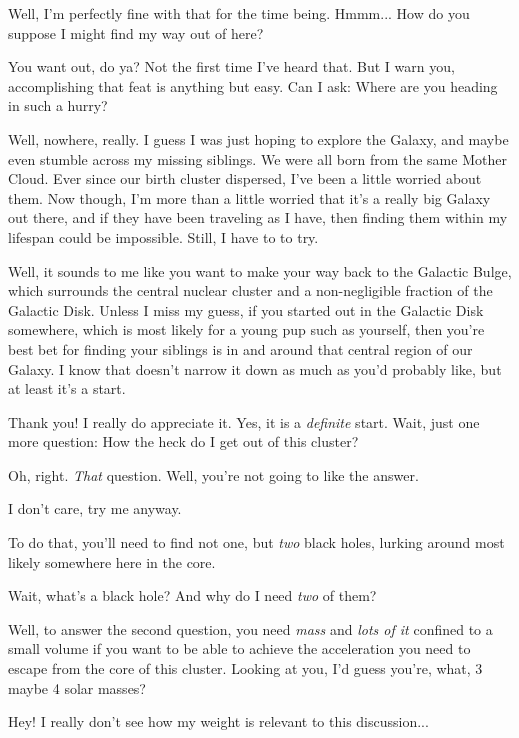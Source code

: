 \documentclass[main.tex]{subfiles}
\begin{document}
\Sterope Well, I'm perfectly fine with that for the time being.  Hmmm... How do you suppose I might find my way out of here?

\Enrico You want out, do ya?  Not the first time I've heard that.  But I warn you, accomplishing that feat is anything but easy.  Can I ask:  Where are you heading in such a hurry?

\Sterope Well, nowhere, really.  I guess I was just hoping to explore the Galaxy, and maybe even stumble across my missing siblings.  We were all born from the same Mother Cloud.  Ever since our birth cluster dispersed, I've been a little worried about them.  Now though, I'm more than a little worried that it's a really big Galaxy out there, and if they have been traveling as I have, then finding them within my lifespan could be impossible.  Still, I have to to try.

\Enrico Well, it sounds to me like you want to make your way back to the Galactic Bulge, which surrounds the central nuclear cluster and a non-negligible fraction of the Galactic Disk.  Unless I miss my guess, if you started out in the Galactic Disk somewhere, which is most likely for a young pup such as yourself, then you're best bet for finding your siblings is in and around that central region of our Galaxy.  I know that doesn't narrow it down as much as you'd probably like, but at least it's a start.

\Sterope Thank you!  I really do appreciate it.  Yes, it is a \textit{definite} start.  Wait, just one more question:  How the heck do I get out of this cluster?

\Enrico Oh, right.  \textit{That} question.  Well, you're not going to like the answer.

\Sterope I don't care, try me anyway.

\Enrico To do that, you'll need to find not one, but \textit{two} black holes, lurking around most likely somewhere here in the core.  

\Sterope Wait, what's a black hole?  And why do I need \textit{two} of them?

\Enrico Well, to answer the second question, you need \textit{mass} and \textit{lots of it} confined to a small volume if you want to be able to achieve the acceleration you need to escape from the core of this cluster.  Looking at you, I'd guess you're, what, 3 maybe 4 solar masses?

\Sterope Hey! I really don't see how my weight is relevant to this discussion...
\end{document}
